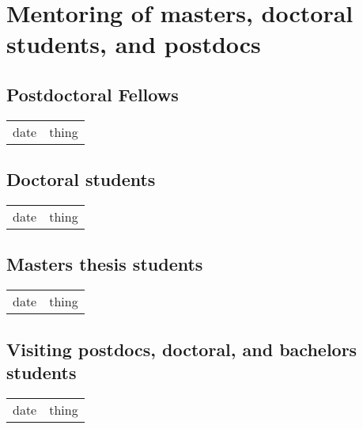 \chapter{Mentoring of masters, doctoral \\students, and postdocs}
\label{students}

\section{Postdoctoral Fellows}

\begin{tabular}[l]{ p{} p{} }

date & thing\\

\end{tabular} 

\section{Doctoral students}

\begin{tabular}[l]{ p{} p{} }

date & thing\\

\end{tabular} 

\section{Masters thesis students}

\begin{tabular}[l]{ p{} p{} }

date & thing\\

\end{tabular} 

\section{Visiting postdocs, doctoral, and bachelors students}

\begin{tabular}[l]{ p{} p{} }

date & thing\\

\end{tabular} 

